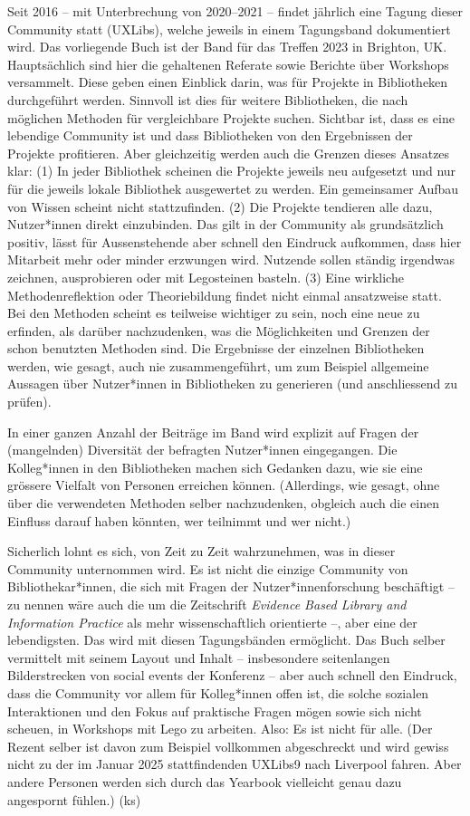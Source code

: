 \documentclass[a4paper,
fontsize=11pt,
oneside,
numbers=noperiodatend,
parskip=half-,
bibliography=totoc,
final
]{scrartcl}
\begin{document}
Seit 2016 -- mit Unterbrechung von 2020--2021 -- findet jährlich eine
Tagung dieser Community statt (UXLibs), welche jeweils in einem
Tagungsband dokumentiert wird. Das vorliegende Buch ist der Band für das
Treffen 2023 in Brighton, UK. Hauptsächlich sind hier die gehaltenen
Referate sowie Berichte über Workshops versammelt. Diese geben einen
Einblick darin, was für Projekte in Bibliotheken durchgeführt werden.
Sinnvoll ist dies für weitere Bibliotheken, die nach möglichen Methoden
für vergleichbare Projekte suchen. Sichtbar ist, dass es eine lebendige
Community ist und dass Bibliotheken von den Ergebnissen der Projekte
profitieren. Aber gleichzeitig werden auch die Grenzen dieses Ansatzes
klar: (1) In jeder Bibliothek scheinen die Projekte jeweils neu
aufgesetzt und nur für die jeweils lokale Bibliothek ausgewertet zu
werden. Ein gemeinsamer Aufbau von Wissen scheint nicht stattzufinden.
(2) Die Projekte tendieren alle dazu, Nutzer*innen direkt einzubinden.
Das gilt in der Community als grundsätzlich positiv, lässt für
Aussenstehende aber schnell den Eindruck aufkommen, dass hier Mitarbeit
mehr oder minder erzwungen wird. Nutzende sollen ständig irgendwas
zeichnen, ausprobieren oder mit Legosteinen basteln. (3) Eine wirkliche
Methodenreflektion oder Theoriebildung findet nicht einmal ansatzweise
statt. Bei den Methoden scheint es teilweise wichtiger zu sein, noch
eine neue zu erfinden, als darüber nachzudenken, was die Möglichkeiten
und Grenzen der schon benutzten Methoden sind. Die Ergebnisse der
einzelnen Bibliotheken werden, wie gesagt, auch nie zusammengeführt, um
zum Beispiel allgemeine Aussagen über Nutzer*innen in Bibliotheken zu
generieren (und anschliessend zu prüfen).

In einer ganzen Anzahl der Beiträge im Band wird explizit auf Fragen der
(mangelnden) Diversität der befragten Nutzer*innen eingegangen. Die
Kolleg*innen in den Bibliotheken machen sich Gedanken dazu, wie sie eine
grössere Vielfalt von Personen erreichen können. (Allerdings, wie
gesagt, ohne über die verwendeten Methoden selber nachzudenken, obgleich
auch die einen Einfluss darauf haben könnten, wer teilnimmt und wer
nicht.)

Sicherlich lohnt es sich, von Zeit zu Zeit wahrzunehmen, was in dieser
Community unternommen wird. Es ist nicht die einzige Community von
Bibliothekar*innen, die sich mit Fragen der Nutzer*innenforschung
beschäftigt -- zu nennen wäre auch die um die Zeitschrift \emph{Evidence
Based Library and Information Practice} als mehr wissenschaftlich
orientierte --, aber eine der lebendigsten. Das wird mit diesen
Tagungsbänden ermöglicht. Das Buch selber vermittelt mit seinem Layout
und Inhalt -- insbesondere seitenlangen Bilderstrecken von social events
der Konferenz -- aber auch schnell den Eindruck, dass die Community vor
allem für Kolleg*innen offen ist, die solche sozialen Interaktionen und
den Fokus auf praktische Fragen mögen sowie sich nicht scheuen, in
Workshops mit Lego zu arbeiten. Also: Es ist nicht für alle. (Der Rezent
selber ist davon zum Beispiel vollkommen abgeschreckt und wird gewiss
nicht zu der im Januar 2025 stattfindenden UXLibs9 nach Liverpool
fahren. Aber andere Personen werden sich durch das Yearbook vielleicht
genau dazu angespornt fühlen.) (ks)
\end{document}
